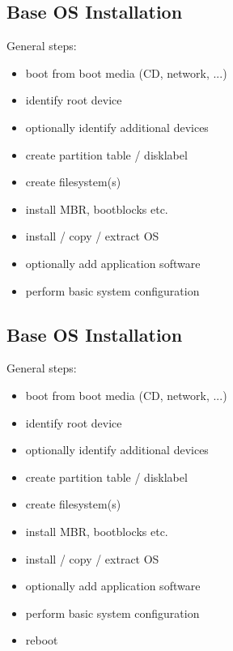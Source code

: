 \documentclass[xga]{xdvislides}
\begin{document}
\subsection{Base OS Installation}
General steps:
\begin{itemize}
	\item boot from boot media (CD, network, ...)
	\item identify root device
	\item optionally identify additional devices
	\item create partition table / disklabel
	\item create filesystem(s)
	\item install MBR, bootblocks etc.
	\item install / copy / extract OS
	\item optionally add application software
	\item perform basic system configuration
\end{itemize}

\subsection{Base OS Installation}
General steps:
\begin{itemize}
	\item boot from boot media (CD, network, ...)
	\item identify root device
	\item optionally identify additional devices
	\item create partition table / disklabel
	\item create filesystem(s)
	\item install MBR, bootblocks etc.
	\item install / copy / extract OS
	\item optionally add application software
	\item perform basic system configuration
	\item reboot
\end{itemize}
\end{document}
